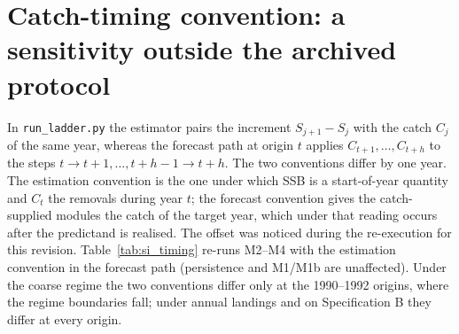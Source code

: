 \documentclass[preprint,11pt,authoryear]{elsarticle}
\theoremstyle{remark}
\begin{document}
\FloatBarrier
\section{Catch-timing convention: a sensitivity outside the archived protocol}\label{si:timing}

In \texttt{run\_ladder.py} the estimator pairs the increment $S_{j+1}-S_j$ with the catch $C_j$ of the same year, whereas the forecast path at origin $t$ applies $C_{t+1},\dots,C_{t+h}$ to the steps $t\to t+1,\dots,t+h-1\to t+h$. The two conventions differ by one year. The estimation convention is the one under which SSB is a start-of-year quantity and $C_t$ the removals during year $t$; the forecast convention gives the catch-supplied modules the catch of the target year, which under that reading occurs after the predictand is realised. The offset was noticed during the re-execution for this revision. Table~\ref{tab:si_timing} re-runs M2--M4 with the estimation convention in the forecast path (persistence and M1/M1b are unaffected). Under the coarse regime the two conventions differ only at the 1990--1992 origins, where the regime boundaries fall; under annual landings and on Specification B they differ at every origin.
\end{document}
